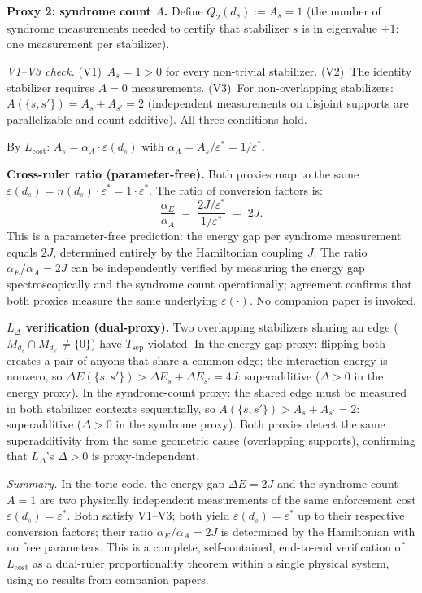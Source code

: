 \documentclass[11pt]{article}
\theoremstyle{remark}
\begin{document}
\smallskip\noindent\textbf{Proxy 2: syndrome count $A$.}  Define $Q_2(d_s) := A_s = 1$ (the number of syndrome measurements needed to certify that stabilizer $s$ is in eigenvalue $+1$: one measurement per stabilizer).

\textit{V1--V3 check.}  (V1)~$A_s = 1 > 0$ for every non-trivial stabilizer.  (V2)~The identity stabilizer requires $A = 0$ measurements.  (V3)~For non-overlapping stabilizers: $A(\{s,s'\}) = A_s + A_{s'} = 2$ (independent measurements on disjoint supports are parallelizable and count-additive).  All three conditions hold.

By $L_{\mathrm{cost}}$: $A_s = \alpha_A \cdot \varepsilon(d_s)$ with $\alpha_A = A_s / \varepsilon^* = 1/\varepsilon^*$.

\smallskip\noindent\textbf{Cross-ruler ratio (parameter-free).}  Both proxies map to the same $\varepsilon(d_s) = n(d_s) \cdot \varepsilon^* = 1 \cdot \varepsilon^*$.  The ratio of conversion factors is:
\[
\frac{\alpha_E}{\alpha_A} \;=\; \frac{2J/\varepsilon^*}{1/\varepsilon^*} \;=\; 2J.
\]
This is a parameter-free prediction: the energy gap per syndrome measurement equals $2J$, determined entirely by the Hamiltonian coupling $J$.  The ratio $\alpha_E/\alpha_A = 2J$ can be independently verified by measuring the energy gap spectroscopically and the syndrome count operationally; agreement confirms that both proxies measure the same underlying $\varepsilon(\cdot)$.  No companion paper is invoked.

\smallskip\noindent\textbf{$L_\Delta$ verification (dual-proxy).}  Two overlapping stabilizers sharing an edge ($M_{d_s} \cap M_{d_{s'}} \ne \{0\}$) have $T_{\mathrm{sep}}$ violated.  In the energy-gap proxy: flipping both creates a pair of anyons that share a common edge; the interaction energy is nonzero, so $\Delta E(\{s,s'\}) > \Delta E_s + \Delta E_{s'} = 4J$: superadditive ($\Delta > 0$ in the energy proxy).  In the syndrome-count proxy: the shared edge must be measured in both stabilizer contexts sequentially, so $A(\{s,s'\}) > A_s + A_{s'} = 2$: superadditive ($\Delta > 0$ in the syndrome proxy).  Both proxies detect the same superadditivity from the same geometric cause (overlapping supports), confirming that $L_\Delta$'s $\Delta > 0$ is proxy-independent.

\smallskip\noindent\textit{Summary.}  In the toric code, the energy gap $\Delta E = 2J$ and the syndrome count $A = 1$ are two physically independent measurements of the same enforcement cost $\varepsilon(d_s) = \varepsilon^*$.  Both satisfy V1--V3; both yield $\varepsilon(d_s) = \varepsilon^*$ up to their respective conversion factors; their ratio $\alpha_E/\alpha_A = 2J$ is determined by the Hamiltonian with no free parameters.  This is a complete, self-contained, end-to-end verification of $L_{\mathrm{cost}}$ as a dual-ruler proportionality theorem within a single physical system, using no results from companion papers.
\end{document}
